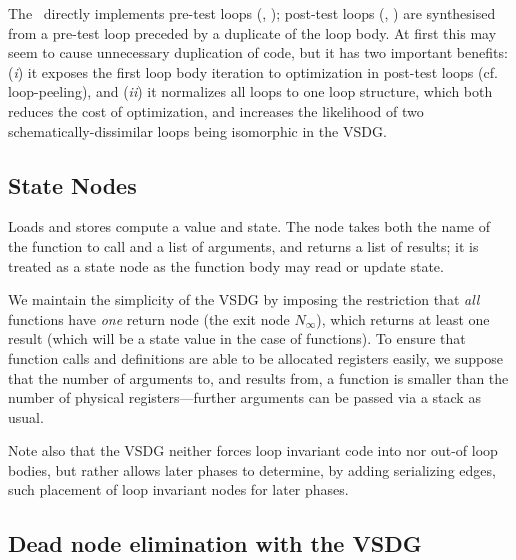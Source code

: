 The \Tn\ directly implements pre-test loops (,
); post-test loops (,
) are synthesised from a pre-test loop preceded by
a duplicate of the loop body.
At first this may seem to cause unnecessary duplication of code, but it has two
important benefits:
({\it i\/}) it exposes the first loop body iteration to optimization in post-test
loops (cf. loop-peeling), and
({\it ii\/}) it normalizes all loops to one loop structure, which both reduces the
cost of optimization, and increases the likelihood of two schematically-dissimilar
loops being isomorphic in the VSDG.


\subsection{State Nodes}

Loads and stores compute a value and state.
The  node takes both the name of the function to call and a
list of arguments, and returns a list of results; it is treated as a state
node as the function body may read or update state.

\medskip

We maintain the simplicity of the VSDG by imposing the restriction that
\emph{all} functions have \emph{one} return node (the exit node $N_\infty$),
which returns at least one result (which will be a state value in the case of
 functions).
To ensure that function calls and definitions are able to be allocated registers easily, we suppose
that the number of arguments to, and results from, a function is smaller
than the number of physical registers---further arguments can be passed
via a stack as usual.

Note also that the VSDG neither forces loop invariant code into nor out-of loop
bodies, but rather allows later phases to determine, by adding serializing edges, such
placement of loop invariant nodes for later phases.

\subsection{Dead node elimination with the VSDG}

